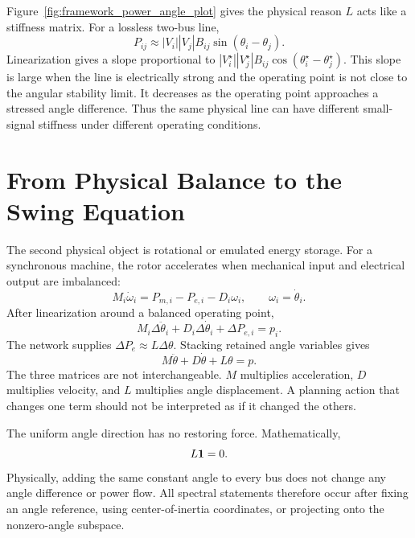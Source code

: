 Figure~\ref{fig:framework_power_angle_plot} gives the physical reason \(L\)
acts like a stiffness matrix. For a lossless two-bus line,
\begin{equation}
  P_{ij}\approx |V_i||V_j|B_{ij}\sin(\theta_i-\theta_j).
  \label{eq:framework_line_power}
\end{equation}
Linearization gives a slope proportional to
\(|V_i^\star||V_j^\star|B_{ij}\cos(\theta_i^\star-\theta_j^\star)\). This
slope is large when the line is electrically strong and the operating point is
not close to the angular stability limit. It decreases as the operating point
approaches a stressed angle difference. Thus the same physical line can have
different small-signal stiffness under different operating conditions.

\section{From Physical Balance to the Swing Equation}

The second physical object is rotational or emulated energy storage. For a
synchronous machine, the rotor accelerates when mechanical input and
electrical output are imbalanced:
\begin{equation}
  M_i\dot\omega_i=P_{m,i}-P_{e,i}-D_i\omega_i,
  \qquad
  \omega_i=\dot\theta_i .
  \label{eq:framework_single_swing}
\end{equation}
After linearization around a balanced operating point,
\begin{equation}
  M_i\Delta\ddot\theta_i+D_i\Delta\dot\theta_i+\Delta P_{e,i}=p_i .
  \label{eq:framework_single_linear_swing}
\end{equation}
The network supplies \(\Delta P_e\approx L\Delta\theta\). Stacking retained
angle variables gives
\begin{equation}
  M\ddot\theta+D\dot\theta+L\theta=p .
  \label{eq:framework_network_swing}
\end{equation}
The three matrices are not interchangeable. \(M\) multiplies acceleration,
\(D\) multiplies velocity, and \(L\) multiplies angle displacement. A planning
action that changes one term should not be interpreted as if it changed the
others.

The uniform angle direction has no restoring force. Mathematically,
\begin{equation}
  L\mathbf 1=0 .
  \label{eq:framework_reference_invariance}
\end{equation}
Physically, adding the same constant angle to every bus does not change any
angle difference or power flow. All spectral statements therefore occur after
fixing an angle reference, using center-of-inertia coordinates, or projecting
onto the nonzero-angle subspace.

